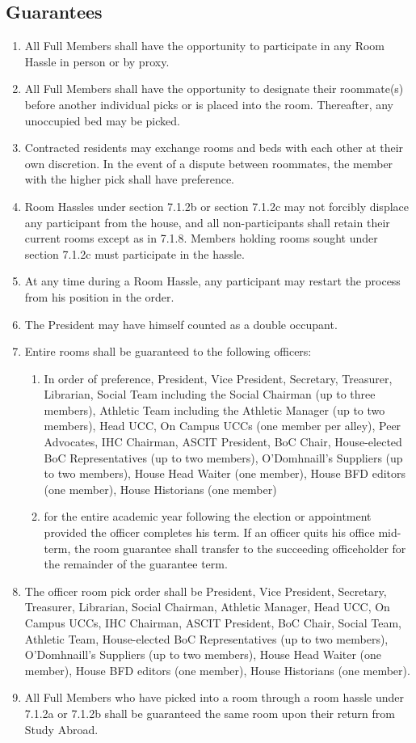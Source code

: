 \documentclass[10pt]{article} %
\begin{document}
\subsection{Guarantees}
\begin{enumerate}
\item All Full Members shall have the opportunity to participate in any Room Hassle in person or by proxy.
\item All Full Members shall have the opportunity to designate their roommate(s) before another individual picks or is placed into the room. Thereafter, any unoccupied bed may be picked.
\item Contracted residents may exchange rooms and beds with each other at their own discretion. In the event of a dispute between roommates, the member with the higher pick shall have preference.
\item Room Hassles under section 7.1.2b or section 7.1.2c may not forcibly displace any participant from the house, and all non-participants shall retain their current rooms except as in 7.1.8. Members holding rooms sought under section 7.1.2c must participate in the hassle.
\item At any time during a Room Hassle, any participant may restart the process from his position in the order.
\item The President may have himself counted as a double occupant.
\item Entire rooms shall be guaranteed to the following officers:
\begin{enumerate}
\item In order of preference, President, Vice President, Secretary, Treasurer, Librarian, Social Team including the Social Chairman (up to three members), Athletic Team including the Athletic Manager (up to two members), Head UCC, On Campus UCCs (one member per alley), Peer Advocates, IHC Chairman, ASCIT President, BoC Chair, House-elected BoC Representatives (up to two members), O’Domhnaill’s Suppliers (up to two members), House Head Waiter (one member), House BFD editors (one member), House Historians (one member)
\item for the entire academic year following the election or appointment provided the officer completes his term. If an officer quits his office mid-term, the room guarantee shall transfer to the succeeding officeholder for the remainder of the guarantee term.
\end{enumerate}
\item The officer room pick order shall be President, Vice President, Secretary, Treasurer, Librarian, Social Chairman, Athletic Manager, Head UCC, On Campus UCCs, IHC Chairman, ASCIT President, BoC Chair, Social Team, Athletic Team, House-elected BoC Representatives (up to two members), O’Domhnaill’s Suppliers (up to two members), House Head Waiter (one member), House BFD editors (one member), House Historians (one member).
\item All Full Members who have picked into a room through a room hassle under 7.1.2a or 7.1.2b shall be guaranteed the same room upon their return from Study Abroad.
\end{enumerate}
\end{document}
